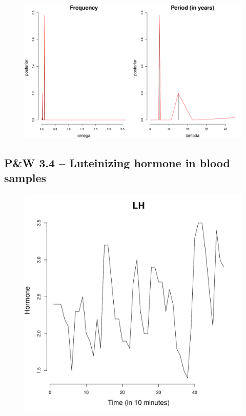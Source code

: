 \documentclass[12pt]{article}
\begin{document}
\begin{figure}[H]
\begin{center}
\includegraphics[scale=0.40]{sp_soi.pdf}
\end{center}
\end{figure}

\newpage

\subsection*{P\&W 3.4 -- Luteinizing hormone in blood samples}

\begin{figure}[H]
\begin{center}
\includegraphics[scale=0.40]{dat_lh.pdf}
\end{center}
\end{figure}
\end{document}
